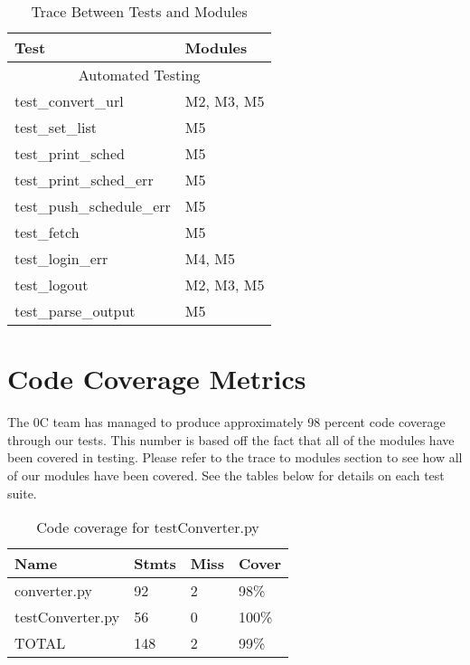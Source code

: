 \documentclass[12pt, titlepage]{article}
\begin{document}
\begin{table}[!htbp]
	\begin{tabular}{ll}
		\toprule
		Test & Modules \\        
		\midrule
		\multicolumn{2}{c}{Automated Testing} \\
		\midrule
        test\_convert\_url & M2, M3, M5 \\
        test\_set\_list & M5  \\
        test\_print\_sched & M5 \\
        test\_print\_sched\_err & M5  \\
        test\_push\_schedule\_err & M5 \\
        test\_fetch & M5 \\
        test\_login\_err & M4, M5\\
        test\_logout & M2, M3, M5 \\
        test\_parse\_output & M5 \\

		\bottomrule
	\end{tabular}
	\caption{Trace Between Tests and Modules}
	\makeatletter
	\def\rulecolor#1#{\CT@arc{#1}}
	\def\CT@arc#1#2{%
		\ifdim\baselineskip=\z@\noalign\fi
		{\gdef\CT@arc@{\color#1{#2}}}}
	\let\CT@arc@\relax
	\makeatother
	\label{Table}
\end{table}

\FloatBarrier %
\FloatBarrier


\section{Code Coverage Metrics}
	The 0C team has managed to produce approximately 98 percent code coverage through our tests. This number is based off the fact that all of the modules have been covered in testing. Please refer to the trace to modules section to see how all of our modules have been covered. See the tables below for details on each test suite.


		\begin{table}[!htbp]
			\begin{tabularx}{\textwidth}{|l|l|l|X|}
				\hline
				\textbf{Name} & \textbf{Stmts} & \textbf{Miss} & \textbf{Cover}
				\\ 
				\hline
			    converter.py  & 92 & 2 & 98\% \\ 
			    testConverter.py & 56 & 0 & 100\% \\ 
				\hline
				\hline
			    TOTAL & 148 & 2 & 99\% \\ 
				\hline
			\end{tabularx}
			\caption{Code coverage for testConverter.py}
			\label{Table}
		\end{table}
		
\end{document}
